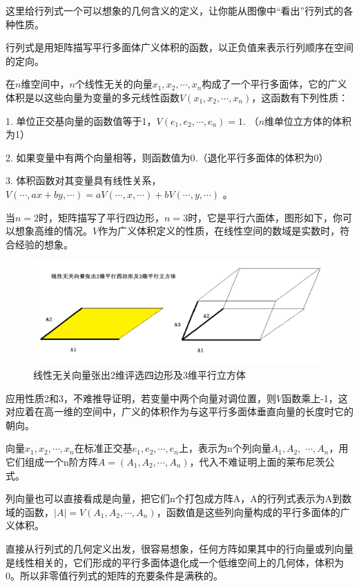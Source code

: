 	这里给行列式一个可以想象的几何含义的定义，让你能从图像中“看出”行列式的各种性质。
	
	行列式是用矩阵描写平行多面体广义体积的函数，以正负值来表示行列顺序在空间的定向。
	
	\kaishu
	
	在$ n $维空间中，$ n $个线性无关的向量$ x_1,x_2,\cdots,x_n $构成了一个平行多面体，它的广义体积是以这些向量为变量的多元线性函数$ V(x_1,x_2,\cdots,x_n) $，这函数有下列性质：
	
	1. 单位正交基向量的函数值等于1，$ V(e_1,e_2,\cdots,e_n)= 1 $. （$ n $维单位立方体的体积为1）
	
	2. 	如果变量中有两个向量相等，则函数值为0.（退化平行多面体的体积为0）
	
	3. 	体积函数对其变量具有线性关系，$ V(\cdots, ax+by, \cdots) = aV(\cdots, x, \cdots) + b V(\cdots, y, \cdots) $ 。
	
	\songti
	
	当$ n=2 $时，矩阵描写了平行四边形，$ n=3 $时，它是平行六面体，图形如下，你可以想象高维的情况。$ V $作为广义体积定义的性质，在线性空间的数域是实数时，符合经验的想象。
	
	\begin{figure}[h]
		\centering
		\includegraphics[width=0.7\linewidth]{pic/160908smn6gw0dy66yp37c.png}
		\caption{线性无关向量张出2维评选四边形及3维平行立方体}
		\label{fig:160908smn6gw0dy66yp37c}
	\end{figure}
	
	应用性质2和3，不难推导证明，若变量中两个向量对调位置，则$ V $函数乘上-1，这对应着在高一维的空间中，广义的体积作为与这平行多面体垂直向量的长度时它的朝向。
	
	向量$ x_1,x_2,\cdots,x_n $在标准正交基$ {e_1,e_2,\cdots,e_n} $上，表示为n个列向量$ A_1, A_2,$  $ \cdots,A_n $，用它们组成一个n阶方阵$ A = (A_1, A_2, \cdots,A_n) $，代入不难证明上面的莱布尼茨公式。
	
	列向量也可以直接看成是向量，把它们n个打包成方阵A，A的行列式表示为A到数域的函数，$ |A| = V(A_1, A_2,\cdots,A_n) $，函数值是这些列向量构成的平行多面体的广义体积。
	
	直接从行列式的几何定义出发，很容易想象，任何方阵如果其中的行向量或列向量是线性相关的，它们形成的平行多面体退化成一个低维空间上的几何体，体积为0。所以非零值行列式的矩阵的充要条件是满秩的。
	
